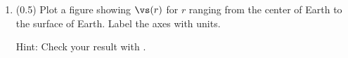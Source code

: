 \documentclass[11pt,titlepage,fleqn]{article}
\begin{document}
\begin{enumerate}
\begin{enumerate}
Hint: Use the command \verb+np.polyval+ to save some time.

\item (0.2) Compute $\vs$ for depths of 1.5~km, 10~km, 20~km, and 50~km.
%
List the values with $>$5 significant digits, so that I can numerically check them.

\item (0.2) Do the values seem reasonable, given the materials you expect at these depths?
\end{enumerate}


\item (0.5) Plot a figure showing $\vs(r)$ for $r$ ranging from the center of Earth to the surface of Earth. Label the axes with units.

Hint: Check your result with \citet[][Figure~1.1]{ShearerE2}.



\end{enumerate}
\end{document}
